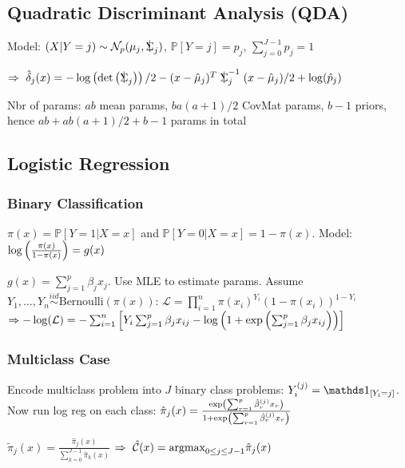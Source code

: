 \subsection{Quadratic Discriminant Analysis (QDA)}
Model: $(X|Y=j) \sim \mathcal{N}_p (\mu_j,\SigmaCov_j)$, $\mathbb{P}[Y=j] = p_j$, $\sum_{j=0}^{J-1} p_j = 1$

$\Rightarrow \ \hat{\delta}_j (x) = - \log \klammer{\det \klammer{\SigmaCov_j}} / 2 - (x-\hat{\mu}_j)^T \SigmaCov_j^{-1} (x-\hat{\mu}_j) / 2 + \log(\hat{p}_j)$

Nbr of params: $a b$ mean params, $b a (a+1) /2$ CovMat params, $b-1$ priors, hence $ab + ab(a+1)/2 + b -1$ params in total

\vspace{-5pt}

\subsection{Logistic Regression}

\subsubsection{Binary Classification}
$\pi(x) = \mathbb{P}[Y=1|X=x]$ and $\mathbb{P}[Y=0|X=x] = 1-\pi(x)$. Model: $\log\left( \frac{\pi(x)}{1-\pi(x)} \right) = g(x)$

\vspace{5pt}

 $g(x) = \sum_{j=1}^p \beta_j x_j$. Use MLE to estimate params. Assume $Y_1,\dots,Y_n \stackrel{iid}{\sim} \text{Bernoulli}(\pi(x))$:
$\mathcal{L} = \prod_{i=1}^n \pi(x_i)^{Y_i} (1-\pi(x_i))^{1-Y_i}$
$\Rightarrow - \log(\mathcal{L}) = - \sum_{i=1}^n \left[ Y_i \sum_{j=1}^p \beta_j x_{ij} - \log \left( 1+\exp \left( \sum_{j=1}^p \beta_j x_{ij} \right) \right) \right]$


\subsubsection{Multiclass Case}
Encode multiclass problem into $J$ binary class problems: $Y_i^{(j)} = \id_{[Y_i = j]}$. Now run log reg on each class:
$\hat{\pi}_j (x) = \frac{\exp \left( \sum_{r=1}^p \hat{\beta}_r^{(j)} x_r \right)}{1 + \exp \left( \sum_{r=1}^p \hat{\beta}_r^{(j)} x_r \right)}$

$\tilde{\pi}_j(x) = \frac{\hat{\pi}_j (x)}{\sum_{k=0}^{J-1} \hat{\pi}_k (x)}$
$\Rightarrow \ \hat{\mathcal{C}} (x) = \text{argmax}_{0 \leq j \leq J-1} \hat{\pi}_j (x)$

